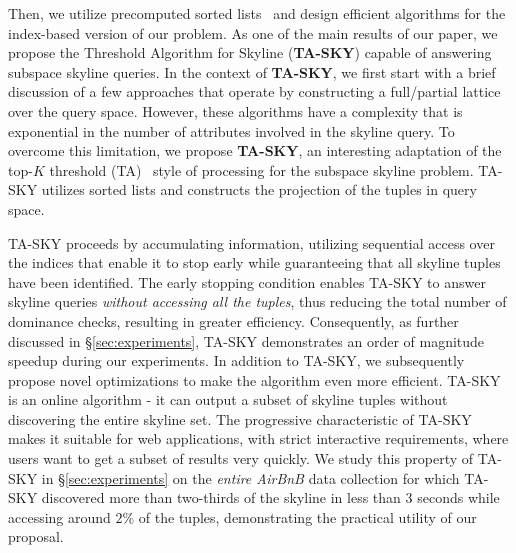 Then, we utilize precomputed sorted lists~\cite{fagin2003optimal} and design efficient algorithms for the index-based version of our problem. 
As one of the main results of our paper, we propose the Threshold Algorithm for Skyline ({\bf TA-SKY}) capable of answering subspace skyline queries. In the context of {\bf TA-SKY}, we first start with a brief discussion of a few approaches that operate by constructing a full/partial lattice over the query space. However, these algorithms have a complexity that is exponential in the number of attributes involved in the skyline query. To overcome this limitation, we propose {\bf TA-SKY}, an interesting adaptation of the top-$K$ threshold (TA)~\cite{fagin2003optimal} style of processing for the subspace skyline problem. TA-SKY utilizes sorted lists and constructs the projection of the tuples in query space. 

TA-SKY proceeds by accumulating information, utilizing sequential access over the indices that enable it to stop early while guaranteeing that all skyline tuples have been identified. The early stopping condition enables TA-SKY to answer skyline queries {\em without accessing all the tuples}, thus reducing the total number of dominance checks, resulting in greater efficiency.
Consequently, as further discussed in \S\ref{sec:experiments}, TA-SKY demonstrates an order of magnitude speedup during our experiments.
In addition to TA-SKY, we subsequently propose novel optimizations to make the algorithm even more efficient. TA-SKY is an online algorithm - it can output a subset of skyline tuples without discovering the entire skyline set. The progressive characteristic of TA-SKY makes it suitable for web applications, with strict interactive requirements, where users want to get a subset of results very quickly.
We study this property of TA-SKY in \S\ref{sec:experiments} on the {\em entire AirBnB} data collection for which TA-SKY discovered more than two-thirds of the skyline in less than $3$ seconds while accessing around $2\%$ of the tuples, demonstrating the practical utility of our proposal.



